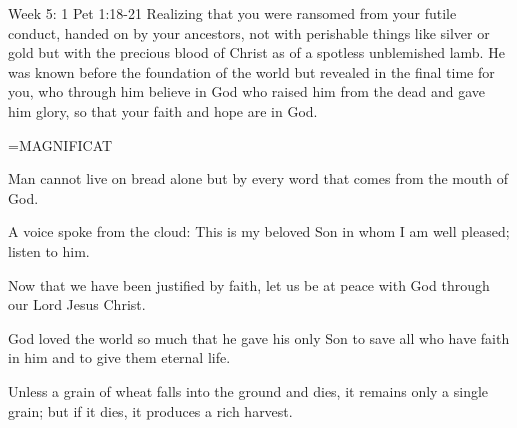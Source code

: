 Week 5:    1 Pet 1:18-21    Realizing that you were ransomed from your futile conduct, handed on by your ancestors, not with perishable things like silver or gold but with the precious blood of Christ as of a spotless unblemished lamb. He was known before the foundation of the world but revealed in the final time for you, who through him believe in God who raised him from the dead and gave him glory, so that your faith and hope are in God. 

\hangindent=\parindent \small MAGNIFICAT
\begin{description}[labelindent=\parindent, noitemsep, leftmargin=*]
\item [Week 1:] 	Man cannot live on bread alone but by every word that comes from the mouth of God.
\item [Week 2:] 	A voice spoke from the cloud: This is my beloved Son in whom I am well pleased; listen to him.
\item [Week 3:] 	Now that we have been justified by faith, let us be at peace with God through our Lord Jesus Christ.
\item [Week 4:] 	God loved the world so much that he gave his only Son to save all who have faith in him and to give them eternal life.
\item [Week 5:] 	Unless a grain of wheat falls into the ground and dies, it remains only a single grain; but if it dies, it produces a rich harvest.
\end{description}

